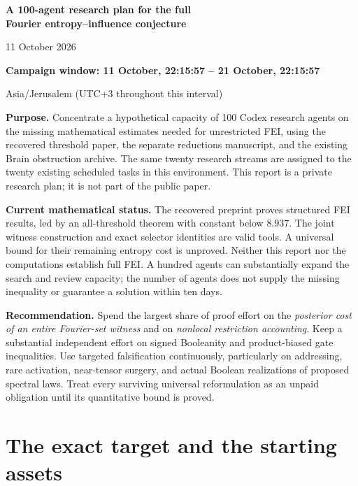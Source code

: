 \documentclass[11pt]{article}
\begin{document}
\begin{center}
{\Large\bfseries\color{ink} A 100-agent research plan for the full\\[3pt] Fourier entropy--influence conjecture}\par
\vspace{8pt}
\vspace{4pt}
11 October 2026\par
\textbf{Campaign window: 11 October, 22:15:57 -- 21 October, 22:15:57}\par
Asia/Jerusalem (UTC+3 throughout this interval)
\end{center}
\vspace{6pt}
\textbf{Purpose.} Concentrate a hypothetical capacity of 100 Codex research agents on the missing mathematical estimates needed for unrestricted FEI, using the recovered threshold paper, the separate reductions manuscript, and the existing Brain obstruction archive. The same twenty research streams are assigned to the twenty existing scheduled tasks in this environment. This report is a private research plan; it is not part of the public paper.

\textbf{Current mathematical status.} The recovered preprint proves structured FEI results, led by an all-threshold theorem with constant below $8.937$. The joint witness construction and exact selector identities are valid tools. A universal bound for their remaining entropy cost is unproved. Neither this report nor the computations establish full FEI. A hundred agents can substantially expand the search and review capacity; the number of agents does not supply the missing inequality or guarantee a solution within ten days.

\textbf{Recommendation.} Spend the largest share of proof effort on the \emph{posterior cost of an entire Fourier-set witness} and on \emph{nonlocal restriction accounting}. Keep a substantial independent effort on signed Booleanity and product-biased gate inequalities. Use targeted falsification continuously, particularly on addressing, rare activation, near-tensor surgery, and actual Boolean realizations of proposed spectral laws. Treat every surviving universal reformulation as an unpaid obligation until its quantitative bound is proved.

\tableofcontents
\newpage
\section{The exact target and the starting assets}
\end{document}
